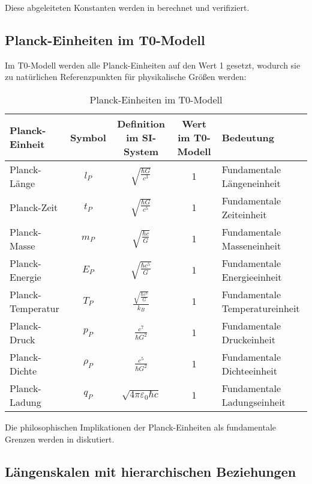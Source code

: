 \documentclass[12pt,a4paper]{article}
\begin{document}
Diese abgeleiteten Konstanten werden in \cite{pascher_nateinhsystem_2025} berechnet und verifiziert.

\subsection*{Planck-Einheiten im T0-Modell}

Im T0-Modell werden alle Planck-Einheiten auf den Wert 1 gesetzt, wodurch sie zu natürlichen Referenzpunkten für physikalische Größen werden:

\begin{table}[H]
	\centering
	\begin{adjustbox}{width=0.95\textwidth}
		\begin{tabular}{lcccl}
			\toprule
			\textbf{Planck-Einheit} & \textbf{Symbol} & \textbf{Definition im SI-System} & \textbf{Wert im T0-Modell} & \textbf{Bedeutung} \\
			\midrule
			Planck-Länge & \(l_P\) & \(\sqrt{\frac{\hbar G}{c^3}}\) & 1 & Fundamentale Längeneinheit \\
			Planck-Zeit & \(t_P\) & \(\sqrt{\frac{\hbar G}{c^5}}\) & 1 & Fundamentale Zeiteinheit \\
			Planck-Masse & \(m_P\) & \(\sqrt{\frac{\hbar c}{G}}\) & 1 & Fundamentale Masseneinheit \\
			Planck-Energie & \(E_P\) & \(\sqrt{\frac{\hbar c^5}{G}}\) & 1 & Fundamentale Energieeinheit \\
			Planck-Temperatur & \(T_P\) & \(\frac{\sqrt{\frac{\hbar c^5}{G}}}{k_B}\) & 1 & Fundamentale Temperatureinheit \\
			Planck-Druck & \(p_P\) & \(\frac{c^7}{\hbar G^2}\) & 1 & Fundamentale Druckeinheit \\
			Planck-Dichte & \(\rho_P\) & \(\frac{c^5}{\hbar G^2}\) & 1 & Fundamentale Dichteeinheit \\
			Planck-Ladung & \(q_P\) & \(\sqrt{4\pi \varepsilon_0 \hbar c}\) & 1 & Fundamentale Ladungseinheit \\
			\bottomrule
		\end{tabular}
	\end{adjustbox}
	\caption{Planck-Einheiten im T0-Modell}
	\label{tab:planck_units}
\end{table}

Die philosophischen Implikationen der Planck-Einheiten als fundamentale Grenzen werden in \cite{pascher_planck_2025} diskutiert.

\subsection*{Längenskalen mit hierarchischen Beziehungen}
\end{document}
